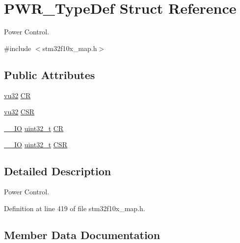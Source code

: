 \hypertarget{struct_p_w_r___type_def}{}\section{P\+W\+R\+\_\+\+Type\+Def Struct Reference}
\label{struct_p_w_r___type_def}


Power Control.  




{\ttfamily \#include $<$stm32f10x\+\_\+map.\+h$>$}

\subsection*{Public Attributes}
\begin{DoxyCompactItemize}
\item 
\hyperlink{agilefox_2library_2inc_2stm32f10x__type_8h_a6e2761f0a1011f84ed96b946f2c8a563}{vu32} \hyperlink{struct_p_w_r___type_def_ad09495e9bf996ab2806d86d673287416}{CR}
\item 
\hyperlink{agilefox_2library_2inc_2stm32f10x__type_8h_a6e2761f0a1011f84ed96b946f2c8a563}{vu32} \hyperlink{struct_p_w_r___type_def_aebb269a260388fc3cc4a7b7c8ec6bba6}{C\+SR}
\item 
\hyperlink{group___c_m_s_i_s___c_m3__core__definitions_gaec43007d9998a0a0e01faede4133d6be}{\+\_\+\+\_\+\+IO} \hyperlink{_p_e___types_8h_a33594304e786b158f3fb30289278f5af}{uint32\+\_\+t} \hyperlink{struct_p_w_r___type_def_aeb6bcdb2b99d58b9a0ffd86deb606eac}{CR}
\item 
\hyperlink{group___c_m_s_i_s___c_m3__core__definitions_gaec43007d9998a0a0e01faede4133d6be}{\+\_\+\+\_\+\+IO} \hyperlink{_p_e___types_8h_a33594304e786b158f3fb30289278f5af}{uint32\+\_\+t} \hyperlink{struct_p_w_r___type_def_ae17097e69c88b6c00033d6fb84a8182b}{C\+SR}
\end{DoxyCompactItemize}


\subsection{Detailed Description}
Power Control. 

Definition at line 419 of file stm32f10x\+\_\+map.\+h.



\subsection{Member Data Documentation}
